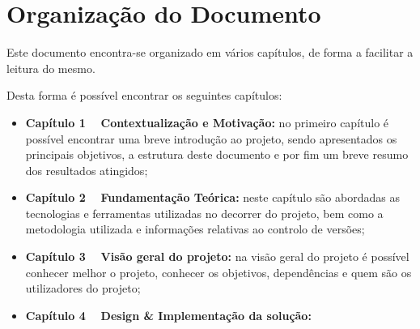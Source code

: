 \section{Organização do Documento}

Este documento encontra-se organizado em vários capítulos, de forma a facilitar a leitura do mesmo.

Desta forma é possível encontrar os seguintes capítulos:

\begin{itemize}
	\item \textbf{Capítulo 1 \textemdash~ Contextualização e Motivação:} no primeiro capítulo é possível encontrar uma breve introdução ao projeto, sendo apresentados os principais objetivos, a estrutura deste documento e por fim um breve resumo dos resultados atingidos;
	\item \textbf{Capítulo 2 \textemdash~ Fundamentação Teórica:} neste capítulo são abordadas as tecnologias e ferramentas utilizadas no decorrer do projeto, bem como a metodologia utilizada e informações relativas ao controlo de versões;
	\item \textbf{Capítulo 3 \textemdash~ Visão geral do projeto:} na visão geral do projeto é possível conhecer melhor o projeto, conhecer os objetivos, dependências e quem são os utilizadores do projeto;
	\item \textbf{Capítulo 4 \textemdash~ Design \& Implementação da solução:}
\end{itemize}
